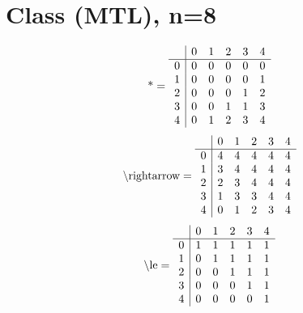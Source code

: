 \documentclass[11pt]{article}
\begin{document}
\section{Class (MTL), n=8}
\[\text{*} = 
\begin{array}{r | r r r r r}
 & 0 & 1 & 2 & 3 & 4 \\ \hline
0 & 0 & 0 & 0 & 0 & 0 \\
1 & 0 & 0 & 0 & 0 & 1 \\
2 & 0 & 0 & 0 & 1 & 2 \\
3 & 0 & 0 & 1 & 1 & 3 \\
4 & 0 & 1 & 2 & 3 & 4 \\
\end{array}
\]
\[\text{\textbackslash rightarrow} = 
\begin{array}{r | r r r r r}
 & 0 & 1 & 2 & 3 & 4 \\ \hline
0 & 4 & 4 & 4 & 4 & 4 \\
1 & 3 & 4 & 4 & 4 & 4 \\
2 & 2 & 3 & 4 & 4 & 4 \\
3 & 1 & 3 & 3 & 4 & 4 \\
4 & 0 & 1 & 2 & 3 & 4 \\
\end{array}
\]
\[\text{\textbackslash le} = 
\begin{array}{r | r r r r r}
 & 0 & 1 & 2 & 3 & 4 \\ \hline
0 & 1 & 1 & 1 & 1 & 1 \\
1 & 0 & 1 & 1 & 1 & 1 \\
2 & 0 & 0 & 1 & 1 & 1 \\
3 & 0 & 0 & 0 & 1 & 1 \\
4 & 0 & 0 & 0 & 0 & 1 \\
\end{array}
\]
\end{document}
